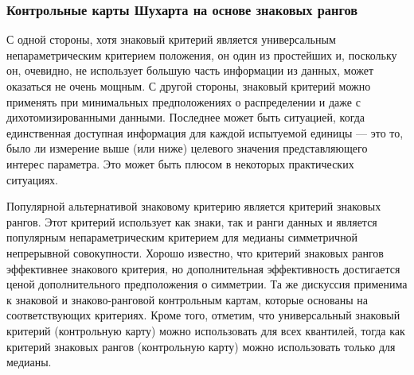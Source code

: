 \subsubsection{Контрольные карты Шухарта на основе знаковых рангов}
С одной стороны, хотя знаковый критерий является универсальным непараметрическим критерием положения, он один из простейших и, поскольку он, очевидно, не использует большую часть информации из данных, может оказаться не очень мощным. С другой стороны, знаковый критерий можно применять при минимальных предположениях о распределении и даже с дихотомизированными данными. Последнее может быть ситуацией, когда единственная доступная информация для каждой испытуемой единицы --- это то, было ли измерение выше (или ниже) целевого значения представляющего интерес параметра. Это может быть плюсом в некоторых практических ситуациях.

Популярной альтернативой знаковому критерию является критерий знаковых рангов. Этот критерий использует как знаки, так и ранги данных и является популярным непараметрическим критерием для медианы симметричной непрерывной совокупности. Хорошо известно, что критерий знаковых рангов эффективнее знакового критерия, но дополнительная эффективность достигается ценой дополнительного предположения о симметрии. Та же дискуссия применима к знаковой и знаково-ранговой контрольным картам, которые основаны на соответствующих критериях. Кроме того, отметим, что универсальный знаковый критерий (контрольную карту) можно использовать для всех квантилей, тогда как критерий знаковых рангов (контрольную карту) можно использовать только для медианы.

